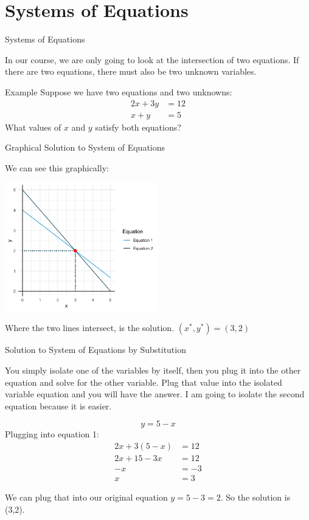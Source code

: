 \documentclass{beamer}
\begin{document}
\section{Systems of Equations}

\begin{frame}{Systems of Equations}

In our course, we are only going to look at the intersection of two equations. If there are two equations, there must also be two unknown variables. 

\begin{exampleblock}{Example}
  Suppose we have two equations and two unknowns:
  \begin{align*}
    2x + 3y &= 12\\ 
    x+y &=5
  \end{align*}
  What values of $x$ and $y$ satisfy both equations?
\end{exampleblock}

\end{frame}

\begin{frame}{Graphical Solution to System of Equations}

We can see this graphically:
\begin{center}
\includegraphics[width = 0.5\textwidth]{SystemsOfEquations.png}
\end{center}

Where the two lines intersect, is the solution. $(x^{*},y^{*}) = (3,2)$
\end{frame}

\begin{frame}{Solution to System of Equations by Substitution}

You simply isolate one of the variables by itself, then you plug it into the other equation and solve for the other variable. Plug that value into the isolated variable equation and you will have the answer. I am going to isolate the second equation because it is easier. 

$$y=5-x$$
Plugging into equation 1:
\begin{align*}
2x + 3(5-x) &= 12\\
2x + 15-3x &= 12\\
-x &= -3\\
x &= 3
\end{align*}

We can plug that into our original equation $y = 5 - 3 = 2$. So the solution is (3,2).

\end{frame}
\end{document}
